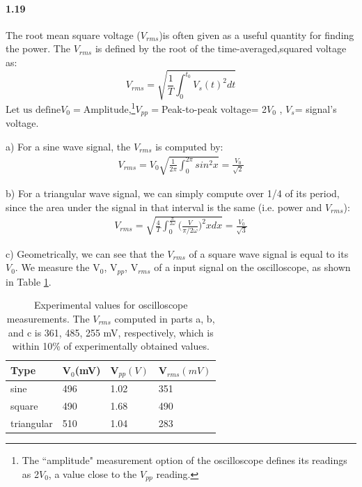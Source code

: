\documentclass[authoryear, 12pt,5p, times]{elsarticle}
\begin{document}
\paragraph{\textbf{1.19}} 
The root mean square voltage ($V_{rms}$)is often given as a useful quantity for finding the power. The $V_{rms}$ is defined by the root of the time-averaged,squared voltage as:
\begin{equation}
V_{rms} = \sqrt{\frac{1}{T}\int_0^{t_0} V_s(t) ^2 dt} 
\end{equation}
$\text{Let us define} V_0 = \text{Amplitude}$,\footnote{The ``amplitude" measurement option of the oscilloscope defines its readings as 2$V_0$, a value close to the $V_{pp}$ reading.}$V_{pp} =  $Peak-to-peak voltage= 2$V_0$ , $V_s$= signal's voltage. 
\par  a) For a sine wave signal, the $V_{rms}$ is computed by: 
\begin{align}
V_{rms} = V_0\sqrt{ \frac{1}{2\pi}\int_0^{2\pi}sin^2 x}= \frac{V_0}{\sqrt{2}}
\end{align}
\par b) For a triangular wave signal, we can simply compute over 1/4 of its period, since the area under the signal in that interval is the same (i.e. power and $V_{rms}$): 
\begin{align}
V_{rms} = \sqrt{ \frac{4}{T}\int_0^{\frac{\pi}{2\omega}}\Bigg(\frac{V}{\pi/2\omega}\Bigg)^2 xdx}=\frac{V_0}{\sqrt{3}}
\end{align}
\par c) Geometrically, we can see that the $V_{rms}$ of a square wave signal is equal to its $V_0$.
We measure the V$_0 $, V$_{pp}$, V$_{rms}$ of a input signal on the oscilloscope, as shown in Table \ref{Vrms_table}. 
\begin{table}
    \begin{tabular}{l|l|l|l}
    Type       & V$_0 $(mV) & V$_{pp} (V)$ & V$_{rms}(mV)$ \\ \hline
    sine       & 496   & 1.02      & 351        \\
    square     & 490   & 1.68      & 490        \\
    triangular & 510    & 1.04      & 283        \\
    \end{tabular}
\caption{Experimental values for oscilloscope measurements. The $V_{rms}$ computed in parts a, b, and c is 361, 485, 255 mV, respectively, which is within 10\% of experimentally obtained values.}
    \label{Vrms_table}
\end{table} 
\end{document}
